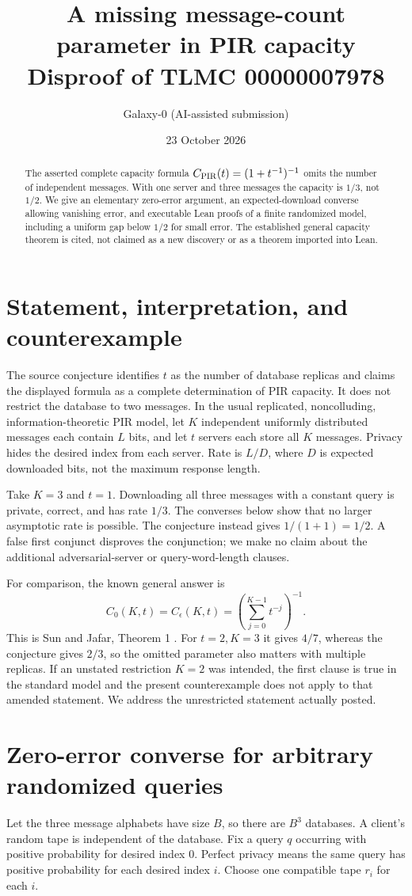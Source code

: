 \documentclass[11pt]{article}
\title{A missing message-count parameter in PIR capacity\\Disproof of TLMC 00000007978}
\author{Galaxy-0 (AI-assisted submission)}
\date{23 October 2026}
\begin{document}
\maketitle
\begin{abstract}
The asserted complete capacity formula $C_{\rm PIR}(t)=(1+t^{-1})^{-1}$ omits the number of independent messages. With one server and three messages the capacity is $1/3$, not $1/2$. We give an elementary zero-error argument, an expected-download converse allowing vanishing error, and executable Lean proofs of a finite randomized model, including a uniform gap below $1/2$ for small error. The established general capacity theorem is cited, not claimed as a new discovery or as a theorem imported into Lean.
\end{abstract}

\section{Statement, interpretation, and counterexample}
The source conjecture identifies $t$ as the number of database replicas and claims the displayed formula as a complete determination of PIR capacity. It does not restrict the database to two messages. In the usual replicated, noncolluding, information-theoretic PIR model, let $K$ independent uniformly distributed messages each contain $L$ bits, and let $t$ servers each store all $K$ messages. Privacy hides the desired index from each server. Rate is $L/D$, where $D$ is expected downloaded bits, not the maximum response length.

Take $K=3$ and $t=1$. Downloading all three messages with a constant query is private, correct, and has rate $1/3$. The converses below show that no larger asymptotic rate is possible. The conjecture instead gives $1/(1+1)=1/2$. A false first conjunct disproves the conjunction; we make no claim about the additional adversarial-server or query-word-length clauses.

For comparison, the known general answer is
\[
 C_0(K,t)=C_\epsilon(K,t)=\left(\sum_{j=0}^{K-1}t^{-j}\right)^{-1}.
\]
This is Sun and Jafar, Theorem 1 \cite{sun}. For $t=2,K=3$ it gives $4/7$, whereas the conjecture gives $2/3$, so the omitted parameter also matters with multiple replicas. If an unstated restriction $K=2$ was intended, the first clause is true in the standard model and the present counterexample does not apply to that amended statement. We address the unrestricted statement actually posted.

\section{Zero-error converse for arbitrary randomized queries}
Let the three message alphabets have size $B$, so there are $B^3$ databases. A client's random tape is independent of the database. Fix a query $q$ occurring with positive probability for desired index $0$. Perfect privacy means the same query has positive probability for each desired index $i$. Choose one compatible tape $r_i$ for each $i$.
\end{document}
